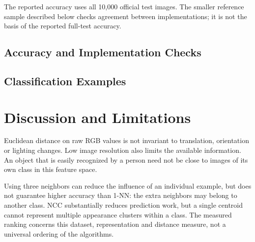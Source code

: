 \documentclass[letterpaper,journal]{IEEEtran}
\begin{document}
The reported accuracy uses all 10,000 official test images. The smaller
reference sample described below checks agreement between implementations;
it is not the basis of the reported full-test accuracy.

\subsection{Accuracy and Implementation Checks}


\subsection{Classification Examples}


\section{Discussion and Limitations}
Euclidean distance on raw RGB values is not invariant to translation,
orientation or lighting changes. Low image resolution also limits the
available information. An object that is easily recognized by a person
need not be close to images of its own class in this feature space.

Using three neighbors can reduce the influence of an individual example,
but does not guarantee higher accuracy than 1-NN: the extra neighbors may
belong to another class. NCC substantially reduces prediction work, but a
single centroid cannot represent multiple appearance clusters within a
class. The measured ranking concerns this dataset, representation and
distance measure, not a universal ordering of the algorithms.



\clearpage
\onecolumn
\lstset{basicstyle=\ttfamily\footnotesize}
\appendices
\end{document}
